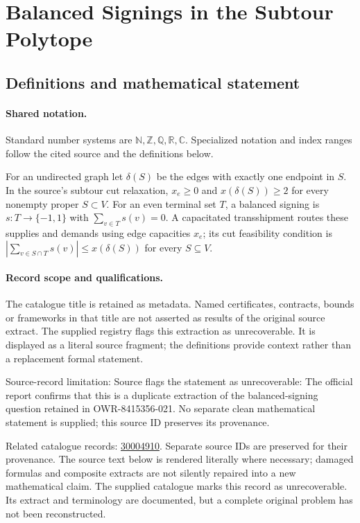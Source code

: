 \documentclass[11pt]{article}
\begin{document}
\section{Balanced Signings in the Subtour Polytope}\label{statement}

\subsection{Definitions and mathematical statement}

\paragraph{Shared notation.}Standard number systems are $\mathbb N,\mathbb Z,\mathbb Q,\mathbb R,\mathbb C$. Specialized notation and index ranges follow the cited source and the definitions below.


For an undirected graph let $\delta(S)$ be the edges with exactly one endpoint in $S$. In the source's subtour cut relaxation, $x_e\geq0$ and $x(\delta(S))\geq2$ for every nonempty proper $S\subset V$. For an even terminal set $T$, a balanced signing is $s:T\to\{-1,1\}$ with $\sum_{v\in T}s(v)=0$. A capacitated transshipment routes these supplies and demands using edge capacities $x_e$; its cut feasibility condition is $|\sum_{v\in S\cap T}s(v)|\leq x(\delta(S))$ for every $S\subseteq V$.
\paragraph{Record scope and qualifications.}
The catalogue title is retained as metadata. Named certificates, contracts, bounds or frameworks in that title are not asserted as results of the original source extract.
The supplied registry flags this extraction as unrecoverable. It is displayed as a literal source fragment; the definitions provide context rather than a replacement formal statement.

Source-record limitation: Source flags the statement as unrecoverable: The official report confirms that this is a duplicate extraction of the balanced-signing question retained in OWR-8415356-021. No separate clean mathematical statement is supplied; this source ID preserves its provenance.

Related catalogue records: \href{https://mehmetmars7.github.io/Erdosproblems-llm-hunter/problem.html?type=open_problems&id=30004910}{30004910}. Separate source IDs are preserved for their provenance.
The source text below is rendered literally where necessary; damaged formulas and composite extracts are not silently repaired into a new mathematical claim.
The supplied catalogue marks this record as unrecoverable. Its extract and terminology are documented, but a complete original problem has not been reconstructed.
\end{document}

